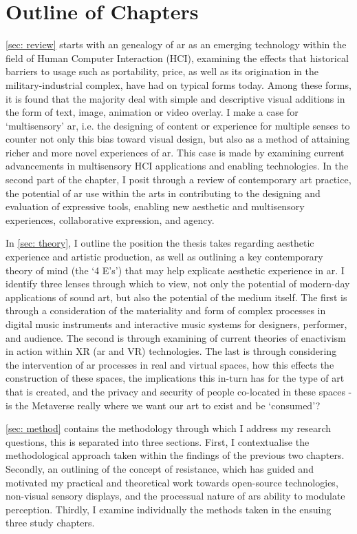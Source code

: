 \section{Outline of Chapters}\label{sec: introduction-outline}
\autoref{sec: review} starts with an genealogy of \ac{ar} as an emerging technology within the field of Human Computer Interaction (HCI), examining the effects that historical barriers to usage such as portability, price, as well as its origination in the military-industrial complex, have had on typical forms today. Among these forms, it is found that the majority deal with simple and descriptive visual additions in the form of text, image, animation or video overlay. I make a case for `multisensory' \ac{ar}, i.e. the designing of content or experience for multiple senses to counter not only this bias toward visual design, but also as a method of attaining richer and more novel experiences of \ac{ar}. This case is made by examining current advancements in multisensory HCI applications and enabling technologies. In the second part of the chapter, I posit through a review of contemporary art practice, the potential of \ac{ar} use within the arts in contributing to the designing and evaluation of expressive tools, enabling new aesthetic and multisensory experiences, collaborative expression, and agency.

In \autoref{sec: theory}, I outline the position the thesis takes regarding aesthetic experience and artistic production, as well as outlining a key contemporary theory of mind (the `4 E's') that may help explicate aesthetic experience in \ac{ar}. I identify three lenses through which to view, not only the potential of modern-day applications of sound \ac{art}, but also the potential of the medium itself. The first is through a consideration of the materiality and form of complex processes in digital music instruments and interactive music systems for designers, performer, and audience. The second is through examining of current theories of enactivism in action within XR (\ac{ar} and VR) technologies. The last is through considering the intervention of \ac{ar} processes in real and virtual spaces, how this effects the construction of these spaces, the implications this in-turn has for the type of art that is created, and the privacy and security of people co-located in these spaces - is the Metaverse really where we want our \ac{art} to exist and be `consumed'? 

\autoref{sec: method} contains the methodology through which I address my research questions, this is separated into three sections. First, I contextualise the methodological approach taken within the findings of the previous two chapters. Secondly, an outlining of the concept of resistance, which has guided and motivated my practical and theoretical work towards open-source technologies, non-visual sensory displays, and the processual nature of \acp{ar} ability to modulate perception. Thirdly, I examine individually the methods taken in the ensuing three study chapters.
 
